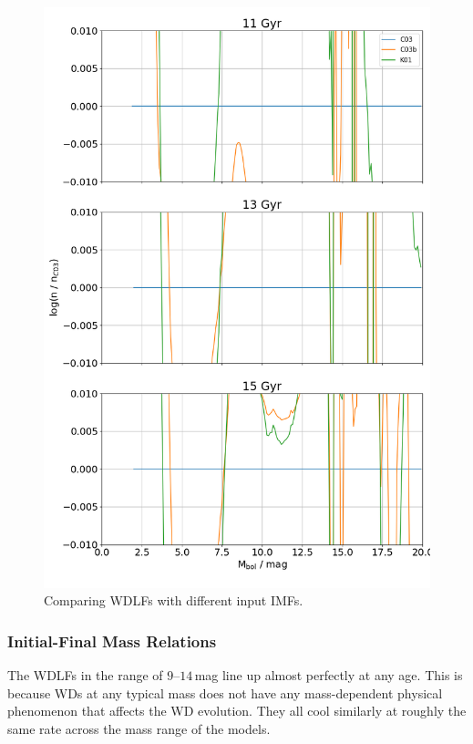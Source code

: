 \documentclass[fleqn,usenatbib]{rasti}
\begin{document}
\begin{figure}
    \centering
    \includegraphics[width=\columnwidth]{wdlf_compare_imf.png}
    \caption{Comparing WDLFs with different input IMFs.}
    \label{fig:wdlf_compare_imf}
\end{figure}

\subsubsection{Initial-Final Mass Relations}
The WDLFs in the range of $9$--$14$\,mag line up almost perfectly at any age.
This is because WDs at any typical mass does not have any mass-dependent
physical phenomenon that affects the WD evolution. They all cool similarly at
roughly the same rate across the mass range of the models. 
\end{document}

